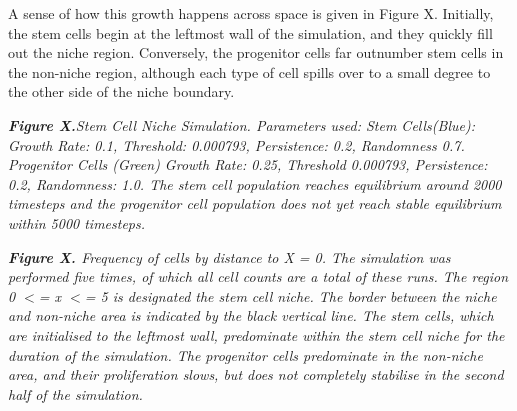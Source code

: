 \documentclass[12pt,a4paper]{report}
\begin{document}
A sense of how this growth happens across space is given in Figure X. 
Initially, the stem cells begin at the leftmost wall of the simulation, 
and they quickly fill out the niche region. Conversely, the progenitor 
cells far outnumber stem cells in the non-niche region, although each 
type of cell spills over to a small degree to the other side of the 
niche boundary.

\begin{figure}[H]
\centering
\end{figure}

{\bfseries {\itshape Figure X.}}{\itshape  Stem Cell Niche Simulation. 
Parameters used: Stem Cells(Blue): Growth Rate: 0.1, Threshold: 
0.000793, Persistence: 0.2, Randomness 0.7. Progenitor Cells (Green) 
Growth Rate: 0.25, Threshold 0.000793, Persistence: 0.2, Randomness: 
1.0. The stem cell population reaches equilibrium around 2000 timesteps 
and the progenitor cell population does not yet reach stable equilibrium 
within 5000 timesteps.}

{\begin{figure}[H]
\centering
\end{figure}
\begin{figure}[H]
\centering
\end{figure}
}

{\begin{figure}[H]
\centering
\end{figure}
\begin{figure}[H]
\centering
\end{figure}
}

{\begin{figure}[H]
\centering
\end{figure}
\begin{figure}[H]
\centering
\end{figure}
}

{\bfseries {\itshape Figure X. }}{\itshape Frequency of cells by distance 
to X = 0. The simulation was performed five times, of which all cell 
counts are a total of these runs. The region 0 $<$= x $<$= 5 is 
designated the stem cell niche. The border between the niche and 
non-niche area is indicated by the black vertical line. The stem cells, 
which are initialised to the leftmost wall, predominate within the stem 
cell niche for the duration of the simulation. The progenitor cells 
predominate in the non-niche area, and their proliferation slows, but 
does not completely stabilise in the second half of the simulation.}
\end{document}
